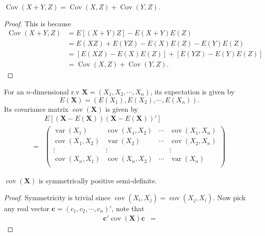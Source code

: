 \documentclass[11pt,singlecolumn, openany, citestyle=authoryear]{elegantbook}
\begin{document}
\begin{CJK}{UTF8}{gbsn}
\begin{property}
\end{property}
\begin{property}
    $\operatorname{Cov}(X+Y,Z)=\operatorname{Cov}(X,Z)+\operatorname{Cov}(Y,Z)$.
\end{property}
\begin{proof}
    This is because 
    \begin{align*}
        \operatorname{Cov}(X+Y,Z)&=E[(X+Y)Z]-E(X+Y)E(Z)\\
        &=E(XZ)+E(YZ)-E(X)E(Z)-E(Y)E(Z)\\
        &=[E(XZ)-E(X)E(Z)]+[E(YZ)-E(Y)E(Z)]\\
        &=\operatorname{Cov}(X,Z)+\operatorname{Cov}(Y,Z).
    \end{align*}
\end{proof}

\begin{definition}
    For an $n$-dimensional r.v $\boldsymbol{X}=(X_1,X_2,\cdots,X_n)$, its expectation is given by 
    $$
    E(\boldsymbol{X})=(E(X_1),E(X_2),\cdots,E(X_n)).
    $$
    Its covariance matrix $\operatorname{cov}(\boldsymbol{X})$ is given by 
    \begin{align*}
        &E[(\boldsymbol{X}-E(\boldsymbol{X}))(\boldsymbol{X}-E(\boldsymbol{X}))']\\
        =&
        \begin{pmatrix}
            \operatorname{var}(X_1) & \operatorname{cov}(X_1,X_2) & \cdots & \operatorname{cov}(X_1,X_n)\\
            \operatorname{cov}(X_1,X_2) & \operatorname{var}(X_2) & \cdots & \operatorname{cov}(X_2,X_n)\\
            \vdots & \vdots & & \vdots \\
            \operatorname{cov}(X_n,X_1) & \operatorname{cov}(X_n,X_2) & \cdots & \operatorname{var}(X_n)\\
        \end{pmatrix}
    \end{align*}
\end{definition}
\begin{theorem}
    $\operatorname{cov}(\boldsymbol{X})$ is symmetrically positive semi-definite.
\end{theorem}
\begin{proof}
    Symmetricity is trivial since $\operatorname{cov}(X_i,X_j)=\operatorname{cov}(X_j,X_i)$.
    Now pick any real vector $\boldsymbol{c}=(c_1,c_2,\cdots,c_n)'$, note that 
    \begin{align*}
        \boldsymbol{c}'\operatorname{cov}(\boldsymbol{X})\boldsymbol{c}&=

\end{align*}
\end{proof}
\end{CJK}
\end{document}
